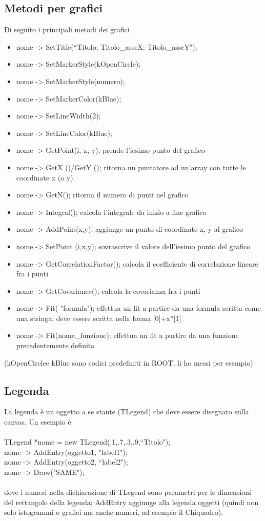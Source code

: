 \documentclass[10pt,a4paper]{article}
\begin{document}
\subsection{Metodi per grafici}
Di seguito i principali metodi dei grafici
\begin{itemize}
	\item nome -> SetTitle(“Titolo; Titolo\_asseX; Titolo\_asseY");
	\item nome -> SetMarkerStyle(kOpenCircle);
	\item nome -> SetMarkerStyle(numero);
	\item nome -> SetMarkerColor(kBlue);
	\item nome -> SetLineWidth(2);
	\item nome -> SetLineColor(kBlue);
	\item nome -> GetPoint(i, x, y);
	prende l’iesimo punto del grafico
	\item nome -> GetX ()/GetY ();
	ritorna un puntatore ad un'array con tutte le coordinate x (o y). 
	\item nome -> GetN();
	ritorna il numero di punti nel grafico
	\item nome -> Integral();
	calcola l'integrale da inizio a fine grafico
	\item nome -> AddPoint(x,y);
	aggiunge un punto di coordinate x, y al grafico
	\item nome -> SetPoint (i,x,y);
	sovrascrive il valore dell'iesimo punto del grafico
	\item nome -> GetCorrelationFactor();
	calcola il coefficiente di correlazione lineare fra i punti
	\item nome -> GetCovariance();
	calcola la covarianza fra i punti
	\item nome -> Fit( "formula");
	effettua un fit a partire da una formula scritta come una stringa; deve essere scritta nella forma [0]+x*[1]
	\item nome -> Fit(nome\_funzione);
	effettua un fit a partire da una funzione precedentemente definita
\end{itemize}
(kOpenCirclee kBlue sono codici predefiniti in ROOT, li ho messi per esempio)
\subsection{Legenda}
La legenda è un oggetto a se stante (TLegend) che deve essere disegnato sulla canvas. Un esempio è:\\\\
TLegend *nome = new TLegend(.1,.7,.3,.9,“Titolo");\\
nome -> AddEntry(oggetto1, "label1");\\
nome -> AddEntry(oggetto2, “label2");\\
nome -> Draw("SAME");\\\\
dove i numeri nella dichiarazione di TLegend sono parametri per le dimensioni del rettangolo della legenda; AddEntry aggiunge alla legenda oggetti (quindi non solo istogrammi o grafici ma anche numeri, ad esempio il Chiquadro). 
\end{document}
